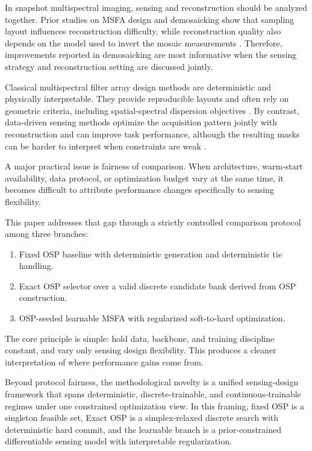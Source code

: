 \documentclass[journal]{IEEEtran}
\begin{document}
In snapshot multispectral imaging, sensing and reconstruction should be analyzed together. Prior studies on MSFA design and demosaicking show that sampling layout influences reconstruction difficulty, while reconstruction quality also depends on the model used to invert the mosaic measurements \cite{hirakawa2008,jia2016,cheng2021,wu2021}. Therefore, improvements reported in demosaicking are most informative when the sensing strategy and reconstruction setting are discussed jointly.

Classical multispectral filter array design methods are deterministic and physically interpretable. They provide reproducible layouts and often rely on geometric criteria, including spatial-spectral dispersion objectives \cite{hirakawa2008,jia2016}. By contrast, data-driven sensing methods optimize the acquisition pattern jointly with reconstruction and can improve task performance, although the resulting masks can be harder to interpret when constraints are weak \cite{rueda2015,correa2015,arguello2014,mejia2018}.

A major practical issue is fairness of comparison. When architecture, warm-start availability, data protocol, or optimization budget vary at the same time, it becomes difficult to attribute performance changes specifically to sensing flexibility.

This paper addresses that gap through a strictly controlled comparison protocol among three branches:
\begin{enumerate}
\item Fixed OSP baseline with deterministic generation and deterministic tie handling.
\item Exact OSP selector over a valid discrete candidate bank derived from OSP construction.
\item OSP-seeded learnable MSFA with regularized soft-to-hard optimization.
\end{enumerate}

The core principle is simple: hold data, backbone, and training discipline constant, and vary only sensing design flexibility. This produces a cleaner interpretation of where performance gains come from.

Beyond protocol fairness, the methodological novelty is a unified sensing-design framework that spans deterministic, discrete-trainable, and continuous-trainable regimes under one constrained optimization view. In this framing, fixed OSP is a singleton feasible set, Exact OSP is a simplex-relaxed discrete search with deterministic hard commit, and the learnable branch is a prior-constrained differentiable sensing model with interpretable regularization.
\end{document}
